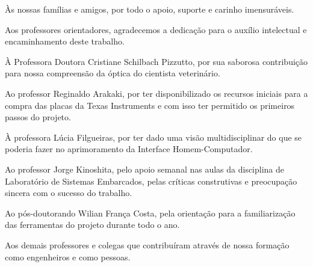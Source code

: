 \begin{agradecimentos}
Às nossas famílias e amigos, por todo o apoio, suporte e carinho imensuráveis.

Aos professores orientadores, agradecemos a dedicação para o auxílio intelectual e encaminhamento deste trabalho.

À Professora Doutora Cristiane Schilbach Pizzutto, por sua saborosa contribuição para nossa compreensão da óptica do cientista veterinário.

Ao professor Reginaldo Arakaki, por ter disponibilizado os recursos iniciais para a compra das placas da Texas Instruments e com isso ter permitido os primeiros passos do projeto. 

À professora Lúcia Filgueiras, por ter dado uma visão multidisciplinar do que se poderia fazer no aprimoramento da Interface Homem-Computador.

Ao professor Jorge Kinoshita, pelo apoio semanal nas aulas da disciplina de Laboratório de Sistemas Embarcados, pelas críticas construtivas e preocupação sincera com o sucesso do trabalho.

Ao pós-doutorando Wilian França Costa, pela orientação para a familiarização das ferramentas do projeto durante todo o ano.

Aos demais professores e colegas que contribuíram através de nossa formação como engenheiros e como pessoas.
\end{agradecimentos}